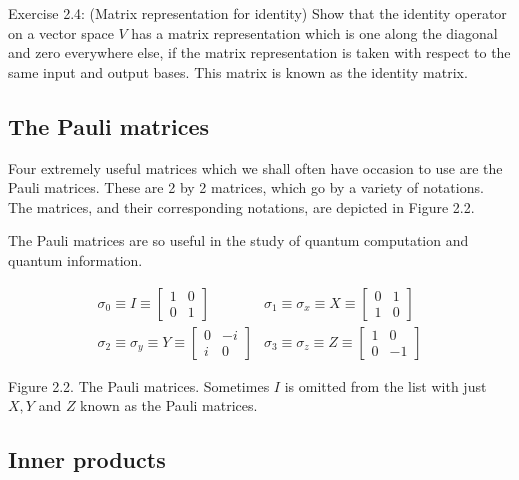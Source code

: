 \documentclass[
	11pt, %
	fleqn, %
	a4paper, %
]{LegrandOrangeBook}
\begin{document}
\begin{exercise}
Exercise 2.4: (Matrix representation for identity) Show that the identity operator on a vector space $V$ has a matrix representation which is one along the diagonal and zero everywhere else, if the matrix representation is taken with respect to the same input and output bases. This matrix is known as the identity matrix.
\end{exercise}


\subsection{The Pauli matrices} %

Four extremely useful matrices which we shall often have occasion to use are the Pauli matrices. These are 2 by 2 matrices, which go by a variety of notations. The matrices, and their corresponding notations, are depicted in Figure 2.2. 


The Pauli matrices are so useful in the study of quantum computation and quantum information.

$$
\begin{aligned}
\sigma_{0} \equiv I \equiv\left[\begin{array}{rr}
1 & 0 \\
0 & 1
\end{array}\right] & \sigma_{1} \equiv \sigma_{x} \equiv X \equiv\left[\begin{array}{rr}
0 & 1 \\
1 & 0
\end{array}\right] \\
\sigma_{2} \equiv \sigma_{y} \equiv Y \equiv\left[\begin{array}{rr}
0 & -i \\
i & 0
\end{array}\right] & \sigma_{3} \equiv \sigma_{z} \equiv Z \equiv\left[\begin{array}{rr}
1 & 0 \\
0 & -1
\end{array}\right]
\end{aligned}
$$

Figure 2.2. The Pauli matrices. Sometimes $I$ is omitted from the list with just $X, Y$ and $Z$ known as the Pauli matrices.

\subsection{Inner products} %
\end{document}
